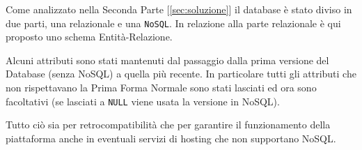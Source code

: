 Come analizzato nella Seconda Parte [\ref{sec:soluzione}] il database è stato diviso in due parti, una relazionale e una \texttt{NoSQL}. In relazione alla parte relazionale è qui proposto uno schema Entità-Relazione.

Alcuni attributi sono stati mantenuti dal passaggio dalla prima versione del Database (senza NoSQL) a quella più recente. In particolare tutti gli attributi che non rispettavano la Prima Forma Normale sono stati lasciati ed ora sono facoltativi (se lasciati a \texttt{NULL} viene usata la versione in NoSQL).

Tutto ciò sia per retrocompatibilità che per garantire il funzionamento della piattaforma anche in eventuali servizi di hosting che non supportano NoSQL.
